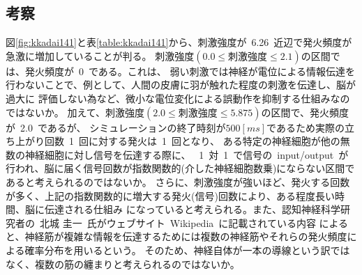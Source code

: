 \documentclass[10pt]{jarticle}
\begin{document}
\subsection{考察}
%
図\ref{fig:kkadai141}と表\ref{table:kkadai141}から、刺激強度が\ 6.26\ 近辺で発火頻度が急激に増加していることが判る。
刺激強度$ ( 0.0 \leq 刺激強度 \leq2.1 ) $の区間では、発火頻度が\ 0\ である。これは、
弱い刺激では神経が電位による情報伝達を行わないことで、例として、人間の皮膚に羽が触れた程度の刺激を伝達し、脳が過大に
評価しない為など、微小な電位変化による誤動作を抑制する仕組みなのではないか。
加えて、刺激強度$ ( 2.0 \leq 刺激強度 \leq5.875 ) $の区間で、発火頻度が\ 2.0\ であるが、
シミュレーションの終了時刻が$ 500[ms] $であるため実際の立ち上がり回数\ 1\ 回に対する発火は\ 1\ 回となり、
ある特定の神経細胞が他の無数の神経細胞に対し信号を伝達する際に、
\ 1\ 対\ 1\ で信号の\ input/output\ が行われ、脳に届く信号回数が指数関数的(介した神経細胞数乗)にならない区間であると考えられるのではないか。
さらに、刺激強度が強いほど、発火する回数が多く、上記の指数関数的に増大する発火(信号)回数により、ある程度長い時間、脳に伝達される仕組み
になっていると考えられる。また、認知神経科学研究者の\ 北城 圭一\ 氏がウェブサイト\ Wikipedia\ に記載されている内容
によると、神経筋が複雑な情報を伝達するためには複数の神経筋やそれらの発火頻度による確率分布を用いるという\cite{kkadai14}。
そのため、神経自体が一本の導線という訳ではなく、複数の筋の纏まりと考えられるのではないか。
\end{document}
